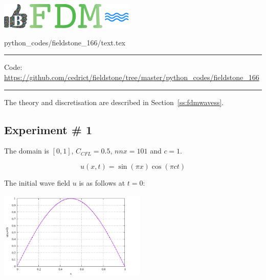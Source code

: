 \noindent
\includegraphics[height=1.25cm]{images/pictograms/benchmark}
\includegraphics[height=1.25cm]{images/pictograms/FDM}
\includegraphics[height=1.25cm]{images/pictograms/wave}


\begin{flushright} {\tiny {\color{gray} python\_codes/fieldstone\_166/text.tex}} \end{flushright}

%

\par\noindent\rule{\textwidth}{0.4pt}

\begin{center}
\inpython
{\small Code: \url{https://github.com/cedrict/fieldstone/tree/master/python_codes/fieldstone_166}}
\end{center}

\par\noindent\rule{\textwidth}{0.4pt}


The theory and discretisation are described in Section~\ref{ss:fdmwavess}.


\subsection*{Experiment \# 1}

The domain is $[0,1]$, $C_{CFL}=0.5$, $nnx=101$ and $c=1$.

\[
u(x,t) = \sin(\pi x) \cos(\pi c t)
\]

The initial wave field $u$ is as follows at $t=0$:
\begin{center}
\includegraphics[width=7cm]{python_codes/fieldstone_166/RESULTS/exp1/u0.pdf}
\end{center}

